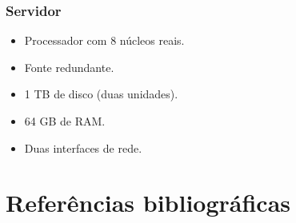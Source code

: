 \documentclass[	DIV=calc,%
							paper=a4,%
							fontsize=12pt,%
							onecolumn]{scrartcl}	 					%
\begin{document}
\subsubsection{Servidor}
\begin{itemize}
	\item Processador com 8 núcleos reais.
	\item Fonte redundante.
	\item 1 TB de disco (duas unidades).
	\item 64 GB de RAM.
	\item Duas interfaces de rede.
\end{itemize}

\pagebreak
\section{Referências bibliográficas}

\renewcommand\refname{} %

  
\end{document}
